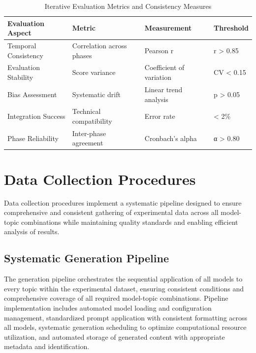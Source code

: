 \begin{table}[htbp]
    \centering
    \caption{Iterative Evaluation Metrics and Consistency Measures}
    \label{tab:iterative-evaluation-metrics}
    \begin{tabular}{|l|l|l|l|}
    \hline
    \textbf{Evaluation Aspect} & \textbf{Metric} & \textbf{Measurement} & \textbf{Threshold} \\
    \hline
    Temporal Consistency & Correlation across phases & Pearson r & r > 0.85 \\
    Evaluation Stability & Score variance & Coefficient of variation & CV < 0.15 \\
    Bias Assessment & Systematic drift & Linear trend analysis & p > 0.05 \\
    Integration Success & Technical compatibility & Error rate & < 2\% \\
    Phase Reliability & Inter-phase agreement & Cronbach's alpha & α > 0.80 \\
    \hline
    \end{tabular}
\end{table}

\section{Data Collection Procedures}
\label{sec:data-collection}

Data collection procedures implement a systematic pipeline designed to ensure comprehensive and consistent gathering of experimental data across all model-topic combinations while maintaining quality standards and enabling efficient analysis of results.

\subsection{Systematic Generation Pipeline}

The generation pipeline orchestrates the sequential application of all models to every topic within the experimental dataset, ensuring consistent conditions and comprehensive coverage of all required model-topic combinations. Pipeline implementation includes automated model loading and configuration management, standardized prompt application with consistent formatting across all models, systematic generation scheduling to optimize computational resource utilization, and automated storage of generated content with appropriate metadata and identification.

